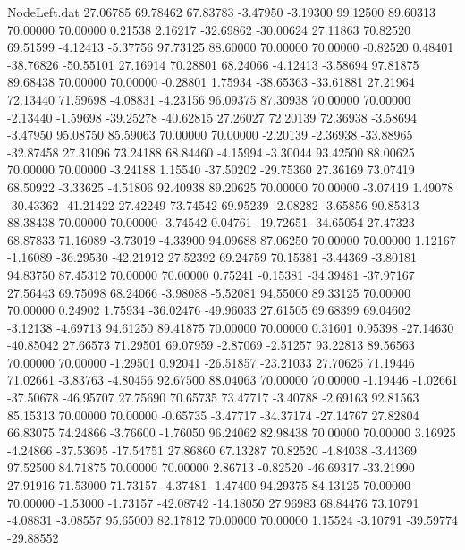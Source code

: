 \begin{filecontents}{NodeLeft.dat}
  27.06785   69.78462   67.83783    -3.47950   -3.19300   99.12500   89.60313   70.00000   70.00000    0.21538    2.16217  -32.69862  -30.00624
  27.11863   70.82520   69.51599    -4.12413   -5.37756   97.73125   88.60000   70.00000   70.00000   -0.82520    0.48401  -38.76826  -50.55101
  27.16914   70.28801   68.24066    -4.12413   -3.58694   97.81875   89.68438   70.00000   70.00000   -0.28801    1.75934  -38.65363  -33.61881
  27.21964   72.13440   71.59698    -4.08831   -4.23156   96.09375   87.30938   70.00000   70.00000   -2.13440   -1.59698  -39.25278  -40.62815
  27.26027   72.20139   72.36938    -3.58694   -3.47950   95.08750   85.59063   70.00000   70.00000   -2.20139   -2.36938  -33.88965  -32.87458
  27.31096   73.24188   68.84460    -4.15994   -3.30044   93.42500   88.00625   70.00000   70.00000   -3.24188    1.15540  -37.50202  -29.75360
  27.36169   73.07419   68.50922    -3.33625   -4.51806   92.40938   89.20625   70.00000   70.00000   -3.07419    1.49078  -30.43362  -41.21422
  27.42249   73.74542   69.95239    -2.08282   -3.65856   90.85313   88.38438   70.00000   70.00000   -3.74542    0.04761  -19.72651  -34.65054
  27.47323   68.87833   71.16089    -3.73019   -4.33900   94.09688   87.06250   70.00000   70.00000    1.12167   -1.16089  -36.29530  -42.21912
  27.52392   69.24759   70.15381    -3.44369   -3.80181   94.83750   87.45312   70.00000   70.00000    0.75241   -0.15381  -34.39481  -37.97167
  27.56443   69.75098   68.24066    -3.98088   -5.52081   94.55000   89.33125   70.00000   70.00000    0.24902    1.75934  -36.02476  -49.96033
  27.61505   69.68399   69.04602    -3.12138   -4.69713   94.61250   89.41875   70.00000   70.00000    0.31601    0.95398  -27.14630  -40.85042
  27.66573   71.29501   69.07959    -2.87069   -2.51257   93.22813   89.56563   70.00000   70.00000   -1.29501    0.92041  -26.51857  -23.21033
  27.70625   71.19446   71.02661    -3.83763   -4.80456   92.67500   88.04063   70.00000   70.00000   -1.19446   -1.02661  -37.50678  -46.95707
  27.75690   70.65735   73.47717    -3.40788   -2.69163   92.81563   85.15313   70.00000   70.00000   -0.65735   -3.47717  -34.37174  -27.14767
  27.82804   66.83075   74.24866    -3.76600   -1.76050   96.24062   82.98438   70.00000   70.00000    3.16925   -4.24866  -37.53695  -17.54751
  27.86860   67.13287   70.82520    -4.84038   -3.44369   97.52500   84.71875   70.00000   70.00000    2.86713   -0.82520  -46.69317  -33.21990
  27.91916   71.53000   71.73157    -4.37481   -1.47400   94.29375   84.13125   70.00000   70.00000   -1.53000   -1.73157  -42.08742  -14.18050
  27.96983   68.84476   73.10791    -4.08831   -3.08557   95.65000   82.17812   70.00000   70.00000    1.15524   -3.10791  -39.59774  -29.88552

\end{filecontents}
